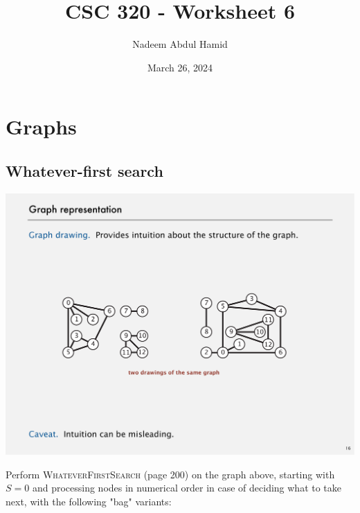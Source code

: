 \documentclass[12pt]{article}
\title{CSC 320 - Worksheet 6}
\author{Nadeem Abdul Hamid}
\date{March 26, 2024}
\begin{document}
\section{Graphs}
\subsection{Whatever-first search}

\includegraphics{w07-graph1.pdf}

Perform \textsc{WhateverFirstSearch} (page 200) on the graph above, starting with $S=0$ and processing nodes in numerical order in case of deciding what to take next, with the following "bag" variants:
\end{document}
